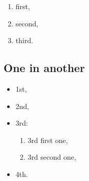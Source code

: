 \documentclass{article}
\begin{document}
\begin{enumerate}
\item first,
\item second,
\item third.
\end{enumerate}

\subsection{One in another}
\begin{itemize}
\item 1st,
\item 2nd,
\item 3rd:
\begin{enumerate}
\item 3rd first one,
\item 3rd second one,
\end{enumerate}
\item 4th.
\end{itemize}
\end{document}
